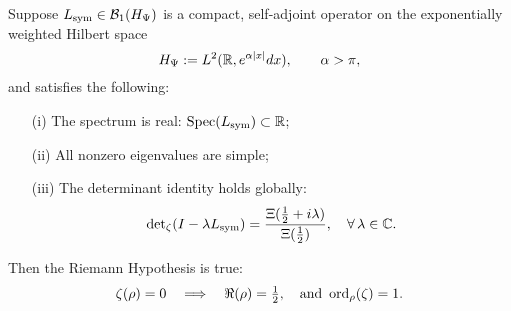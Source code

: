 \begin{theorem}
\label{thm:rh_from_real_simple_spectrum}

Suppose \( L_{\mathrm{sym}} \in \mathcal{B}_1(H_{\Psi}) \) is a compact, self-adjoint operator on the exponentially weighted Hilbert space
\[
H_{\Psi} := L^2(\mathbb{R}, e^{\alpha |x|} dx), \qquad \alpha > \pi,
\]
and satisfies the following:
\begin{itemize}
  \item[\textup{(i)}] The spectrum is real: \( \operatorname{Spec}(L_{\mathrm{sym}}) \subset \mathbb{R} \);
  \item[\textup{(ii)}] All nonzero eigenvalues are simple;
  \item[\textup{(iii)}] The determinant identity holds globally:
  \[
  \det\nolimits_\zeta(I - \lambda L_{\mathrm{sym}}) = \frac{\Xi(\tfrac{1}{2} + i\lambda)}{\Xi(\tfrac{1}{2})}, \quad \forall\, \lambda \in \mathbb{C}.
  \]
\end{itemize}

Then the Riemann Hypothesis is true:
\[
\zeta(\rho) = 0 \quad \Longrightarrow \quad \Re(\rho) = \tfrac{1}{2}, \quad \text{and } \operatorname{ord}_\rho(\zeta) = 1.
\]
\end{theorem}
